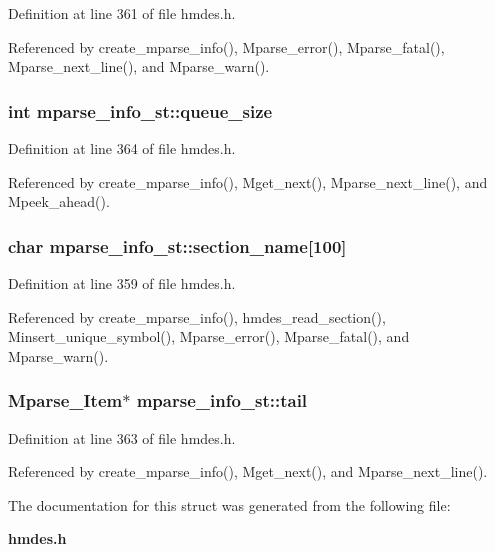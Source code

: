 Definition at line 361 of file hmdes.h.

Referenced by create\_\-mparse\_\-info(), Mparse\_\-error(), Mparse\_\-fatal(), Mparse\_\-next\_\-line(), and Mparse\_\-warn().
\subsubsection{\setlength{\rightskip}{0pt plus 5cm}int \bf{mparse\_\-info\_\-st::queue\_\-size}}\label{structmparse__info__st_d256edcdec28f595d57173c973915364}




Definition at line 364 of file hmdes.h.

Referenced by create\_\-mparse\_\-info(), Mget\_\-next(), Mparse\_\-next\_\-line(), and Mpeek\_\-ahead().
\subsubsection{\setlength{\rightskip}{0pt plus 5cm}char \bf{mparse\_\-info\_\-st::section\_\-name}[100]}\label{structmparse__info__st_f3c71fe570c19c3ada807a1f9912ca13}




Definition at line 359 of file hmdes.h.

Referenced by create\_\-mparse\_\-info(), hmdes\_\-read\_\-section(), Minsert\_\-unique\_\-symbol(), Mparse\_\-error(), Mparse\_\-fatal(), and Mparse\_\-warn().
\subsubsection{\setlength{\rightskip}{0pt plus 5cm}\bf{Mparse\_\-Item}$\ast$ \bf{mparse\_\-info\_\-st::tail}}\label{structmparse__info__st_fbaa581f1d4cdf3059ef5fb598bfa4f3}




Definition at line 363 of file hmdes.h.

Referenced by create\_\-mparse\_\-info(), Mget\_\-next(), and Mparse\_\-next\_\-line().

The documentation for this struct was generated from the following file:\begin{CompactItemize}
\item 
\bf{hmdes.h}\end{CompactItemize}
